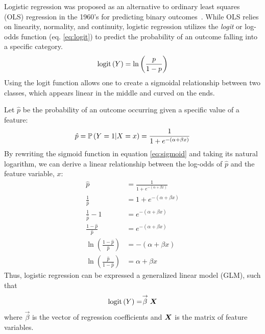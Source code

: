 Logistic regression was proposed as an alternative to ordinary least squares (OLS) regression in the 1960's for predicting binary outcomes~\citep{An-Introduction-to-Logistic-Regression-Analysis-and-Reporting}. 
While OLS relies on linearity, normality, and continuity, logistic regression utilizes the \emph{logit} or log-odds function (eq. \ref{eq:logit}) to predict the probability of an outcome falling into a specific category. 
\begin{align}
    \logit{Y} = \ln \left( \frac{p}{1-p} \right) \label{eq:logit}
\end{align}
Using the logit function allows one to create a sigmoidal relationship between two classes, which appears linear in the middle and curved on the ends.

Let $\hat{p}$ be the probability of an outcome occurring given a specific value of a feature:
\begin{align}
    \hat{p} = \prob{Y = 1 | X = x} = \frac{1}{1 + e^{-(\alpha + \beta x)}} \label{eq:sigmoid}
\end{align}
By rewriting the sigmoid function in equation \ref{eq:sigmoid} and taking its natural logarithm, we can derive a linear relationship between the log-odds of $\hat{p}$ and the feature variable, $x$:
\begin{align*}
    \hat{p} &= \frac{1}{1 + e^{-(\alpha + \beta x)}} \\
    \frac{1}{\hat{p}} &= 1 + e^{-(\alpha + \beta x)} \\
    \frac{1}{\hat{p}} - 1 &= e^{-(\alpha + \beta x)} \\
    \frac{1 - \hat{p}}{\hat{p}} &= e^{-(\alpha + \beta x)} \\
    \ln \left( \frac{1 - \hat{p}}{\hat{p}} \right) &= -(\alpha + \beta x) \\
    \ln \left( \frac{\hat{p}}{1 - \hat{p}} \right) &= \alpha + \beta x
\end{align*}
Thus, logistic regression can be expressed a generalized linear model (GLM), such that
\begin{align*}
    \text{logit}\left( Y \right) = \stackrel{\rightarrow}{\beta}\boldsymbol{X}
\end{align*}
where $\vec{\beta}$ is the vector of regression coefficients and $\boldsymbol{X}$ is the matrix of feature variables.

